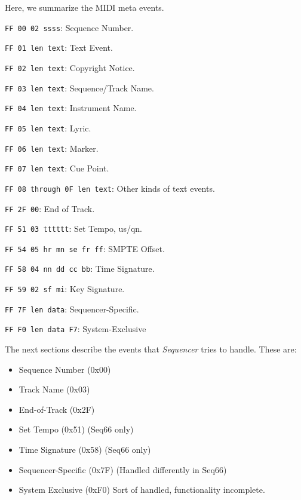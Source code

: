    Here, we summarize the MIDI meta events.

   \begin{enumber}
      \item \texttt{FF 00 02 ssss}: Sequence Number.
      \item \texttt{FF 01 len text}: Text Event.
      \item \texttt{FF 02 len text}: Copyright Notice.
      \item \texttt{FF 03 len text}: Sequence/Track Name.
      \item \texttt{FF 04 len text}: Instrument Name.
      \item \texttt{FF 05 len text}: Lyric.
      \item \texttt{FF 06 len text}: Marker.
      \item \texttt{FF 07 len text}: Cue Point.
      \item \texttt{FF 08 through 0F len text}: Other kinds of  text events.
      \item \texttt{FF 2F 00}: End of Track.
      \item \texttt{FF 51 03 tttttt}: Set Tempo, us/qn.
      \item \texttt{FF 54 05 hr mn se fr ff}: SMPTE Offset.
      \item \texttt{FF 58 04 nn dd cc bb}: Time Signature.
      \item \texttt{FF 59 02 sf mi}: Key Signature.
      \item \texttt{FF 7F len data}: Sequencer-Specific.
      \item \texttt{FF F0 len data F7}: System-Exclusive
   \end{enumber}

   The next sections describe the events that \textsl{Sequencer} tries to
   handle.  These are:

   \begin{itemize}
      \item Sequence Number (0x00)
      \item Track Name (0x03)
      \item End-of-Track (0x2F)
      \item Set Tempo (0x51) (Seq66 only)
      \item Time Signature (0x58) (Seq66 only)
      \item Sequencer-Specific (0x7F) (Handled differently in Seq66)
      \item System Exclusive (0xF0) Sort of handled, functionality incomplete.
   \end{itemize}

